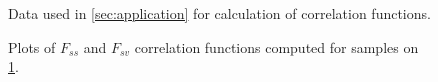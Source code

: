 \documentclass[reprint,amsmath,amssymb,aps,pre]{revtex4-1}
\begin{document}
\begin{figure}[t]
{    \label{fig:carbonate2}}
  \hfill
  \caption[]{Data used in \cref{sec:application} for calculation of correlation
    functions.}
  \label{fig:real-data}
\end{figure}

\begin{figure}[t]
  \centering
  \hfill
  \caption[]{Plots of $F_{ss}$ and $F_{sv}$ correlation functions computed for
    samples on \cref{fig:real-data}.}
  \label{fig:real-data-plots}
\end{figure}
\end{document}

